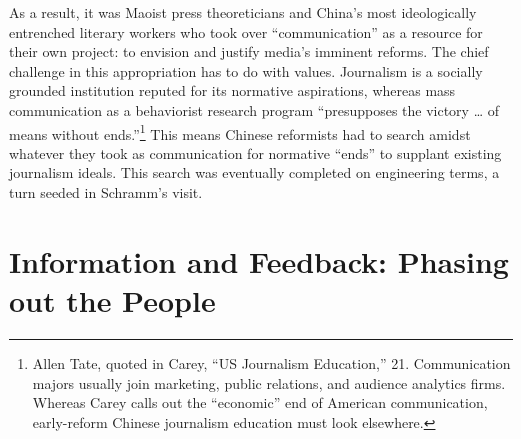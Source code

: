 \documentclass{tufte-handout}
\begin{document}
\begin{CJK*}{UTF8}{gbsn}
As a result, it was Maoist press theoreticians and China's most
ideologically entrenched literary workers who took over
``communication'' as a resource for their own project: to envision and
justify media's imminent reforms. The chief challenge in this
appropriation has to do with values. Journalism is a socially grounded
institution reputed for its normative aspirations, whereas mass
communication as a behaviorist research program ``presupposes the
victory \ldots{} of means without ends.''\footnote{Allen Tate, quoted in
  Carey, ``US Journalism Education,'' 21. Communication majors usually
  join marketing, public relations, and audience analytics firms.
  Whereas Carey calls out the ``economic'' end of American
  communication, early-reform Chinese journalism education must look
  elsewhere.} This means Chinese reformists had to search amidst
whatever they took as communication for normative ``ends'' to supplant
existing journalism ideals. This search was eventually completed on
engineering terms, a turn seeded in Schramm's visit.

\end{CJK*}


\hypertarget{information-and-feedback-phasing-out-the-people}{%
\section{Information and Feedback: Phasing out the
People}\label{information-and-feedback-phasing-out-the-people}}
\end{document}
